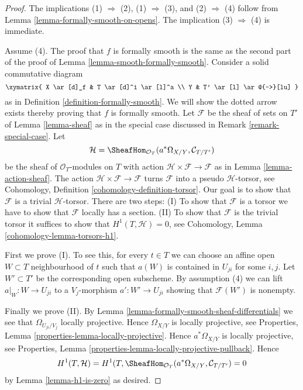 \begin{proof}
The implications (1) $\Rightarrow$ (2),
(1) $\Rightarrow$ (3), and (2) $\Rightarrow$ (4) follow from
Lemma \ref{lemma-formally-smooth-on-opens}.
The implication (3) $\Rightarrow$ (4) is immediate.

\medskip\noindent
Assume (4). The proof that $f$ is formally smooth is the same
as the second part of the proof of Lemma \ref{lemma-smooth-formally-smooth}.
Consider a solid commutative diagram
$$
\xymatrix{
X \ar[d]_f & T \ar[d]^i \ar[l]^a \\
Y & T' \ar[l] \ar@{-->}[lu]
}
$$
as in Definition \ref{definition-formally-smooth}.
We will show the dotted arrow exists thereby
proving that $f$ is formally smooth.
Let $\mathcal{F}$ be the sheaf of sets on $T'$ of
Lemma \ref{lemma-sheaf} as in the special case discussed in
Remark \ref{remark-special-case}.
Let
$$
\mathcal{H} =
\SheafHom_{\mathcal{O}_T}(a^*\Omega_{X/Y}, \mathcal{C}_{T/T'})
$$
be the sheaf of $\mathcal{O}_T$-modules on $T$
with action $\mathcal{H} \times \mathcal{F} \to \mathcal{F}$ as in
Lemma \ref{lemma-action-sheaf}.
The action $\mathcal{H} \times \mathcal{F} \to \mathcal{F}$
turns $\mathcal{F}$ into a pseudo $\mathcal{H}$-torsor, see
Cohomology, Definition \ref{cohomology-definition-torsor}.
Our goal is to show that $\mathcal{F}$ is a trivial $\mathcal{H}$-torsor.
There are two steps: (I) To show that $\mathcal{F}$ is a torsor
we have to show that $\mathcal{F}$ locally has a
section. (II) To show that $\mathcal{F}$ is the trivial torsor
it suffices to show that $H^1(T, \mathcal{H}) = 0$, see
Cohomology, Lemma \ref{cohomology-lemma-torsors-h1}.

\medskip\noindent
First we prove (I). To see this, for every $t \in T$ we can
choose an affine open $W \subset T$ neighbourhood of $t$
such that $a(W)$ is contained in $U_{ji}$ for some $i, j$.
Let $W' \subset T'$ be the corresponding open subscheme.
By assumption (4) we can lift $a|_W : W \to U_{ji}$
to a $V_j$-morphism $a' : W' \to U_{ji}$ showing that
$\mathcal{F}(W')$ is nonempty.

\medskip\noindent
Finally we prove (II). By
Lemma \ref{lemma-formally-smooth-sheaf-differentials}
we see that $\Omega_{U_{ji}/V_j}$ locally projective.
Hence $\Omega_{X/Y}$ is locally projective, see
Properties, Lemma \ref{properties-lemma-locally-projective}.
Hence $a^*\Omega_{X/Y}$ is locally projective, see
Properties, Lemma \ref{properties-lemma-locally-projective-pullback}.
Hence
$$
H^1(T, \mathcal{H}) =
H^1(T, \SheafHom_{\mathcal{O}_T}(a^*\Omega_{X/Y}, \mathcal{C}_{T/T'}) = 0
$$
by
Lemma \ref{lemma-h1-is-zero}
as desired.
\end{proof}

